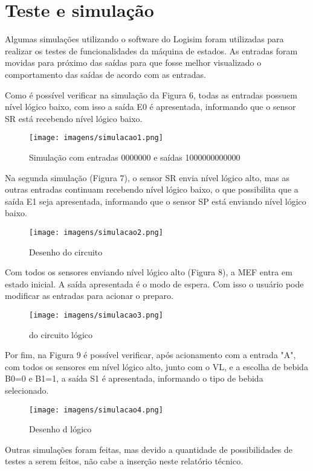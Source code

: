\section{Teste e simulação}

Algumas simulações utilizando o software do Logisim foram utilizadas para realizar os testes de funcionalidades da máquina de estados. As entradas foram movidas para próximo das saídas para que fosse melhor visualizado o comportamento das saídas de acordo com as entradas.

Como é possível verificar na simulação da Figura 6, todas as entradas possuem nível lógico baixo, com isso a saída E0 é apresentada, informando que o sensor SR está recebendo nível lógico baixo.

\begin{figure}[]
    \centering
    \texttt{[image: imagens/simulacao1.png]}
    \caption{Simulação com entradas 0000000 e saídas 1000000000000}
    \label{fig:simulacao1}
\end{figure}

Na segunda simulação (Figura 7), o sensor SR envia nível lógico alto, mas as outras entradas continuam recebendo nível lógico baixo, o que possibilita que a saída E1 seja apresentada, informando que o sensor SP está enviando nível lógico baixo.

\begin{figure}[]
    \centering
    \texttt{[image: imagens/simulacao2.png]}
    \caption{Desenho do circuito }
    \label{fig:simulacao2}
\end{figure}

Com todos os sensores enviando nível lógico alto (Figura 8), a MEF entra em estado inicial. A saída apresentada é o modo de espera. Com isso o usuário pode modificar as entradas para acionar o preparo.

\begin{figure}[]
    \centering
    \texttt{[image: imagens/simulacao3.png]}
    \caption{ do circuito lógico}
    \label{fig:simulacao3}
\end{figure}

Por fim, na Figura 9 é possível verificar, após acionamento com a entrada "A", com todos os sensores em nível lógico alto, junto com o VL, e a escolha de bebida B0=0 e B1=1, a saída S1 é apresentada, informando o tipo de bebida selecionado.

\begin{figure}[]
    \centering
    \texttt{[image: imagens/simulacao4.png]}
    \caption{Desenho d lógico}
    \label{fig:simulacao4}
\end{figure}

Outras simulações foram feitas, mas devido a quantidade de possibilidades de testes a serem feitos, não cabe a inserção neste relatório técnico.